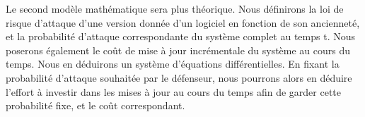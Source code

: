 Le second modèle mathématique sera plus théorique. Nous définirons la loi de risque d'attaque d'une version donnée d'un logiciel en fonction de son ancienneté, et la probabilité d'attaque correspondante du système complet au temps t. Nous poserons également le coût de mise à jour incrémentale du système au cours du temps. Nous en déduirons un système d'équations différentielles. En fixant la probabilité d'attaque souhaitée par le défenseur, nous pourrons alors en déduire l'effort à investir dans les mises à jour au cours du temps afin de garder cette probabilité fixe, et le coût correspondant.